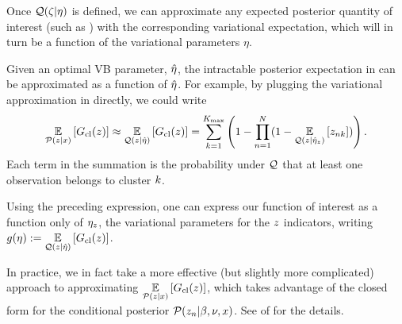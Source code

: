 Once $\mathcal{Q}(\zeta \vert \eta)$ is defined,
we can approximate any expected posterior quantity of interest
(such as ) with the
corresponding variational expectation, which will
in turn be a function of the variational parameters $\eta$.

\begin{ex}
%
Given an optimal VB parameter, $\hat\eta$, the intractable posterior expectation
in  can be approximated as a function of
$\hat\eta$.  For example, by plugging the variational approximation in directly,
we could write
%
\begin{align*}
%
\expect{\p(\z\vert\x)}{\nclusters(\z)} \approx
\expect{\q(\z\vert\etaopt)}{\nclusters(\z)} =
\sumk \left(1 -  \prod_{\n=1}^\N
    (1 - \expect{\q(\z \vert \etaoptz)}{\z_{\n\k}})\right).
%
\end{align*}
%
Each term in the summation is the probability under $\mathcal{Q}$ that at least
one observation belongs to cluster $k$.

Using the preceding expression, one can express our function of interest as a
function only of $\eta_z$, the variational parameters for the $z$ indicators,
writing $g(\eta) := \underset{\mathcal{Q}(z\vert\hat\eta)}{\mathbb{E}}\left[G_{\text{cl}}(z)\right]$.

In practice, we in fact take a more effective (but slightly more complicated)
approach to approximating $\underset{\mathcal{P}(z\vert x)}{\mathbb{E}}\left[G_{\text{cl}}(z)\right]$, which
takes advantage of the closed form for the conditional posterior $\mathcal{P}(z_n \vert
\beta, \nu, x)$.  See  of
 for the details.
%
\end{ex}
